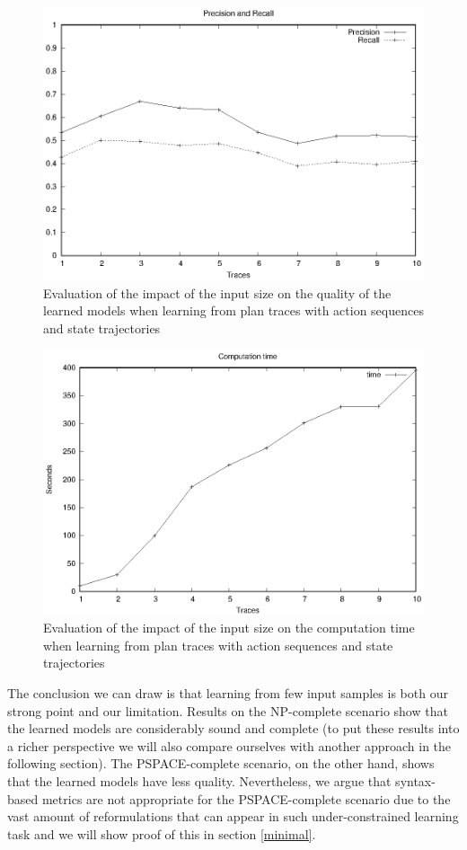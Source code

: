 \begin{figure}[hbt!]
	\centering
	\includegraphics[width=0.65\linewidth]{figures/input_size_0_0_precision.eps}
	\caption{Evaluation of the impact of the input size on the quality of the learned models when learning from plan traces with \NO action sequences and \NO state trajectories}
	\label{fig:pspace_quality}
\end{figure}
\begin{figure}[hbt!]
	\centering
	\includegraphics[width=0.65\linewidth]{figures/input_size_0_0_time.eps}
	\caption{Evaluation of the impact of the input size on the computation time when learning from plan traces with \NO action sequences and \NO state trajectories}
	\label{fig:pspace_time}
\end{figure}


The conclusion we can draw is that learning from few input samples is both our strong point and our limitation. Results on the NP-complete scenario show that the learned models are considerably sound and complete (to put these results into a richer perspective we will also compare ourselves with another approach in the following section). The PSPACE-complete scenario, on the other hand, shows that the learned models have less quality. Nevertheless, we argue that syntax-based metrics are not appropriate for the PSPACE-complete scenario due to the vast amount of reformulations that can appear in such under-constrained learning task and we will show proof of this in section \ref{minimal}.


